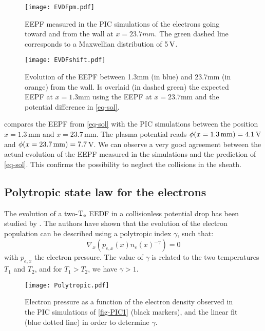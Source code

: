     \begin{figure}[!hbt]
      \centering
      \texttt{[image: EVDFpm.pdf]}
      \caption{EEPF measured in the PIC simulations of the electrons going toward and from the wall at $x=23.7mm$. The green dashed line corresponds to a Maxwellian distribution of 5${\mathrm{\,V}}$.}
      \label{fig-EVDFpm}
    \end{figure}

    \begin{figure}[!hbt]
      \centering
      \texttt{[image: EVDFshift.pdf]}
      \caption{Evolution of the EEPF between 1.3mm (in blue) and 23.7mm (in orange) from the wall. Is overlaid (in dashed green) the expected  EEPF at $x=1.3$mm using the EEPF at $x=23.7$mm and the potential difference in \cref{eq-sol}. }
      \label{fig-PICEEPF}
    \end{figure}

     compares the EEPF from \cref{eq-sol} with the \ac{PIC} simulations between the position $x=1.3$\,mm and $x=23.7$\,mm.
    The plasma potential reads $\phi(x=1.3\,{\rm mm})=4.1$\,V and  $\phi(x=23.7\,{\rm mm})=7.7$\,V.
    We can observe a very good agreement between the actual evolution of the EEPF measured in the simulations and the prediction of \cref{eq-sol}.
    This confirms the possibility to neglect the collisions in the sheath.

  \subsection{Polytropic state law for the electrons}

    The evolution of a two-$\mathrm{T_e}$ EEDF  in a collisionless potential drop has been studied by \citet{zhang2016}.
    The authors have shown that the evolution of the electron population can be described using a polytropic index $\gamma$, such that\string:
    \begin{equation}
      \label{eq-poly}
      \nabla_x \left( p_{e,x}(x) n_e(x)^{-\gamma} \right)= 0
    \end{equation}
    with $p_{e,x}$ the electron pressure.
    The value of $\gamma$ is related to the two temperatures $T_1$ and $T_2$, and for $T_1 > T_2$, we have $\gamma > 1 $.




    \begin{figure}[!htb]
      \centering
      \texttt{[image: Polytropic.pdf]}
      \caption{Electron pressure as a function of the electron density observed in the PIC simulations of \cref{fig-PIC1} (black markers), and the linear fit (blue dotted line) in order to determine $\gamma$.}
      \label{fig-polyFit}
    \end{figure}

